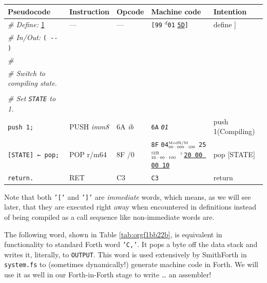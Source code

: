 \documentclass[a4paper,12pt,final]{article}
\begin{document}
\pagebreak
\begin{table}[!htbp] \begin{adjustwidth}{-1cm}{-1cm} \fontsize{10}{12.000000}\selectfont
\begin{center}
\begin{tabular}{l|ll|lH}
\textbf{Pseudocode} & \textbf{Instruction} & \textbf{Opcode} & \textbf{Machine code} & \textbf{Intention}\\[0pt]
\hline
\emph{\# Define:} \uline{\texttt{]}} & --- & --- & \texttt{[99} \(^{d}\)​\texttt{01} \uline{\texttt{5D}}​\texttt{]} & define ]\\[0pt]
\emph{\# In/Out:} \texttt{( -​- )} &  &  &  & \\[0pt]
\emph{\#} &  &  &  & \\[0pt]
\emph{\# Switch to compiling state.} &  &  &  & \\[0pt]
 &  &  &  & \\[0pt]
\emph{\# Set \texttt{STATE} to 1.} &  &  &  & \\[0pt]
\texttt{push 1;} & PUSH \emph{imm8} & 6A \emph{ib} & \texttt{6A} \emph{\texttt{01}} & push 1(Compiling)\\[0pt]
\texttt{[STATE] ← pop;} & POP r/m64 & 8F /0 & \texttt{8F} \texttt{04}​\(^{\text{\tiny ModR/M}}_{\text{\tiny 00·000·100}}\) \texttt{25}​\(^{\text{\tiny    SIB}}_{\text{\tiny 25·00·100}}\) \(^{\text{\tiny +}}\)​\uline{\texttt{20 00 00 10}} & pop [STATE]\\[0pt]
\texttt{return.} & RET & C3 & \texttt{C3} & return\\[0pt]
\end{tabular}
\captionof{table}{\label{tab:orgef7f625}Subroutine \texttt{']'} changes Forth's \texttt{STATE} to compiling (x86-64).}

\end{center}
\normalsize \end{adjustwidth} \end{table} \vspace{0}

Note that both \texttt{'['} and \texttt{']'} are \emph{immediate} words, which means, as
we will see later, that they are executed right away when encountered
in definitions instead of being compiled as a call sequence like
non-immediate words are.

The following word, shown in Table \ref{tab:orgf1bb22b}, is equivalent in
functionality to standard Forth word \texttt{'C,'}​. It pops a byte off the
data stack and writes it, literally, to \texttt{OUTPUT}.  This word is used
extensively by SmithForth in \texttt{system.fs} to (sometimes dynamically!)
generate machine code in Forth.  We will use it as well in our
Forth-in-Forth stage to write \ldots{} an assembler!
\end{document}
